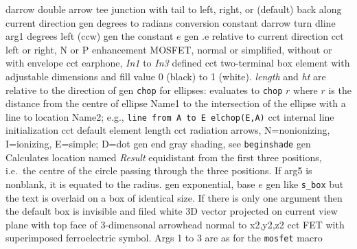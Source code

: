  {darrow}
  {double arrow tee junction with tail to left,
   right, or (default) back along current direction }
  {gen}
  {degrees to radians conversion constant}
  {darrow}
  {turn dline arg1 degrees left (ccw)}
%
  {gen}
  {the constant $e$}
  {gen}
  {.e relative to current direction}
  {cct}
  {left or right, N or P enhancement MOSFET, normal
   or simplified, without or with envelope
    }
  {cct}
  {earphone, {\sl In1} to {\sl In3} defined
   }
  {cct}
  { two-terminal box element with adjustable dimensions and fill
   value 0 (black) to 1 (white). {\sl length} and {\sl ht} are relative
   to the direction of \linespec{}}
  {gen}
  {{\tt chop} for ellipses: evaluates to {\tt chop} $r$ where $r$ is
    the distance from the centre of ellipse Name1 to the intersection of
    the ellipse with a line to location Name2;
    e.g., {\tt line from A to E elchop(E,A)}}
  {cct}
  {internal line initialization}
  {cct}
  {default element length}
  {cct}
  {radiation arrows, N=nonionizing, I=ionizing, E=simple;
     D=dot}
  {gen}
  {end gray shading, see {\tt beginshade}}
  {gen}
  {Calculates location named {\sl Result} equidistant from the first three
   positions, i.e.\ the centre of the circle passing through the three
   positions.  If arg5 is nonblank, it is equated to the radius.}
  {gen}
  {exponential, base $e$}
%
  {gen}
  {like {\tt s\_box} but the text is overlaid on a box of identical size.
   If there is only one argument then the default box
   is invisible and filed white
    }
  {3D}
  {vector projected on current view plane with top face
   of 3-dimensonal arrowhead normal to x2,y2,z2 }
  {cct}
  {FET with superimposed ferroelectric symbol. Args 1 to 3 are as for
   the {\tt mosfet} macro
    }
